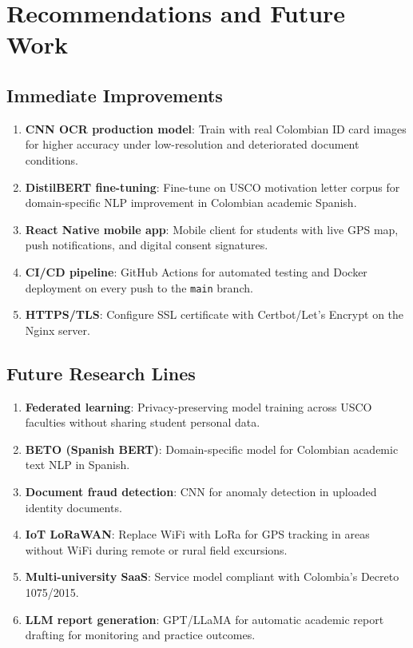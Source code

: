 \documentclass[12pt,a4paper,twoside]{report}
\begin{document}
\chapter{Recommendations and Future Work}

\section{Immediate Improvements}

\begin{enumerate}[leftmargin=*]
\item \textbf{CNN OCR production model}: Train with real Colombian ID card images for higher accuracy
under low-resolution and deteriorated document conditions.
\item \textbf{DistilBERT fine-tuning}: Fine-tune on USCO motivation letter corpus for domain-specific
NLP improvement in Colombian academic Spanish.
\item \textbf{React Native mobile app}: Mobile client for students with live GPS map, push notifications,
and digital consent signatures.
\item \textbf{CI/CD pipeline}: GitHub Actions for automated testing and Docker deployment on every
push to the \texttt{main} branch.
\item \textbf{HTTPS/TLS}: Configure SSL certificate with Certbot/Let's Encrypt on the Nginx server.
\end{enumerate}

\section{Future Research Lines}

\begin{enumerate}[leftmargin=*]
\item \textbf{Federated learning}: Privacy-preserving model training across USCO faculties without
sharing student personal data.
\item \textbf{BETO (Spanish BERT)}: Domain-specific model for Colombian academic text NLP in Spanish.
\item \textbf{Document fraud detection}: CNN for anomaly detection in uploaded identity documents.
\item \textbf{IoT LoRaWAN}: Replace WiFi with LoRa for GPS tracking in areas without WiFi during
remote or rural field excursions.
\item \textbf{Multi-university SaaS}: Service model compliant with Colombia's Decreto 1075/2015.
\item \textbf{LLM report generation}: GPT/LLaMA for automatic academic report drafting for monitoring
and practice outcomes.
\end{enumerate}
\end{document}
